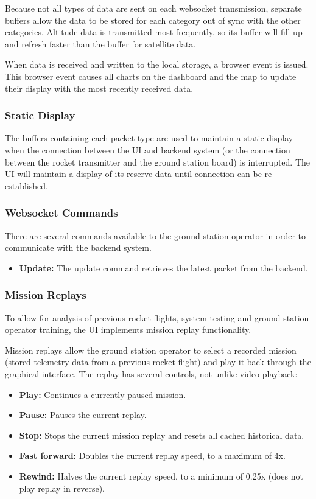 Because not all types of data are sent on each websocket transmission, separate buffers allow the data to be stored for each
category out of sync with the other categories. Altitude data is transmitted most frequently, so its buffer will fill up and
refresh faster than the buffer for satellite data.

When data is received and written to the local storage, a browser event is issued. This browser event causes all charts on the
dashboard and the map to update their display with the most recently received data.

\subsubsection{Static Display}

The buffers containing each packet type are used to maintain a static display when the connection between the UI and backend
system (or the connection between the rocket transmitter and the ground station board) is interrupted. The UI will maintain
a display of its reserve data until connection can be re-established.

\subsubsection{Websocket Commands}

There are several commands available to the ground station operator in order to communicate with the backend system.

\begin{itemize}
    \item \textbf{Update:} The update command retrieves the latest packet from the backend.
\end{itemize}

\subsubsection{Mission Replays}

To allow for analysis of previous rocket flights, system testing and ground station operator training, the UI implements 
mission replay functionality.

Mission replays allow the ground station operator to select a recorded mission (stored telemetry data from a previous rocket
flight) and play it back through the graphical interface. The replay has several controls, not unlike video playback:

\begin{itemize}
    \item \textbf{Play:} Continues a currently paused mission.
    \item \textbf{Pause:} Pauses the current replay.
    \item \textbf{Stop:} Stops the current mission replay and resets all cached historical data.
    \item \textbf{Fast forward:} Doubles the current replay speed, to a maximum of 4x.
    \item \textbf{Rewind:} Halves the current replay speed, to a minimum of 0.25x (does not play replay in reverse).
\end{itemize}

